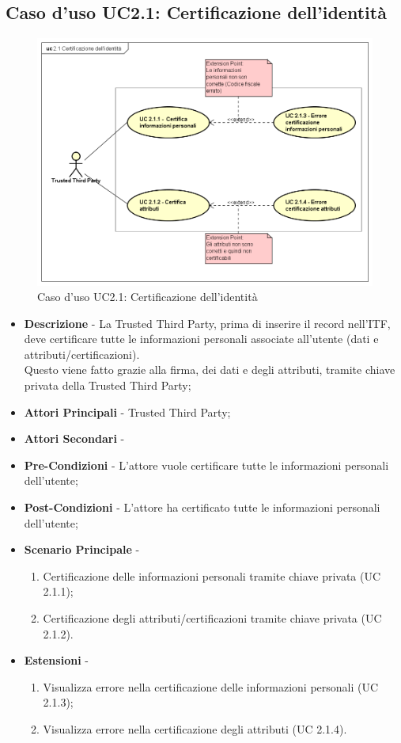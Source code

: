 \subsection{Caso d'uso UC2.1: Certificazione dell'identità}
\begin{figure}[h]
	\centering
	\includegraphics[scale=0.50]{immagini/usecase/UC21_CertificazioneIdentita}
	\caption{Caso d'uso UC2.1: Certificazione dell'identità}
\end{figure}
\begin{itemize}
	\item \textbf{Descrizione} - La Trusted Third Party, prima di inserire il record nell'ITF, deve certificare tutte le informazioni personali associate all'utente (dati e attributi/certificazioni).\\
	Questo viene fatto grazie alla firma, dei dati e degli attributi, tramite chiave privata della Trusted Third Party;
	\item \textbf{Attori Principali} - Trusted Third Party;
	\item \textbf{Attori Secondari} -
	\item \textbf{Pre-Condizioni} - L'attore vuole certificare tutte le informazioni personali dell'utente;
	\item \textbf{Post-Condizioni} - L'attore ha certificato tutte le informazioni personali dell'utente;
	\item \textbf{Scenario Principale} -
	\begin{enumerate}
		\item Certificazione delle informazioni personali tramite chiave privata (UC 2.1.1);
		\item Certificazione degli attributi/certificazioni tramite chiave privata (UC 2.1.2).
	\end{enumerate}
	\item \textbf{Estensioni} -
	\begin{enumerate}
		\item Visualizza errore nella certificazione delle informazioni personali (UC 2.1.3);
		\item Visualizza errore nella certificazione degli attributi (UC 2.1.4).
	\end{enumerate}
\end{itemize}
